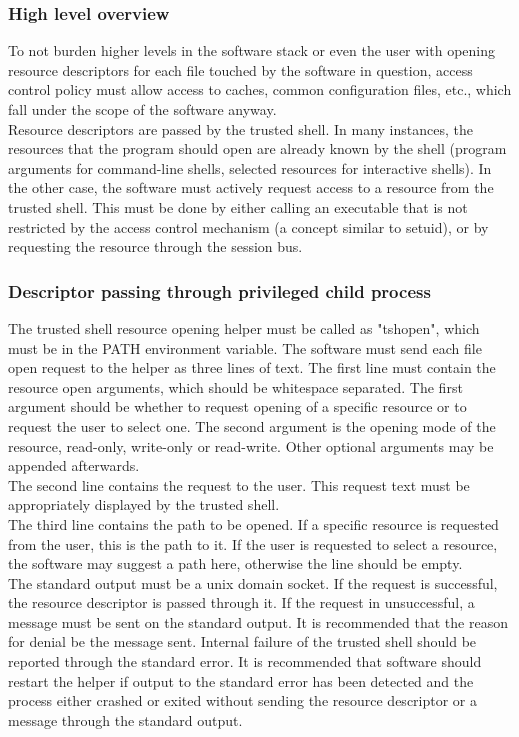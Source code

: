 \subsubsection{High level overview}
To not burden higher levels in the software stack or even the user with opening resource descriptors for each file touched by the software in question, access control policy must allow access to caches, common configuration files, etc., which fall under the scope of the software anyway.\\
Resource descriptors are passed by the trusted shell. In many instances, the resources that the program should open are already known by the shell (program arguments for command-line shells, selected resources for interactive shells). In the other case, the software must actively request access to a resource from the trusted shell. This must be done by either calling an executable that is not restricted by the access control mechanism (a concept similar to setuid), or by requesting the resource through the session bus.
\subsubsection{Descriptor passing through privileged child process}
The trusted shell resource opening helper must be called as "tshopen", which must be in the PATH environment variable. The software must send each file open request to the helper as three lines of text. The first line must contain the resource open arguments, which should be whitespace separated. The first argument should be whether to request opening of a specific resource or to request the user to select one. The second argument is the opening mode of the resource, read-only, write-only or read-write. Other optional arguments may be appended afterwards.\\
The second line contains the request to the user. This request text must be appropriately displayed by the trusted shell.\\
The third line contains the path to be opened. If a specific resource is requested from the user, this is the path to it. If the user is requested to select a resource, the software may suggest a path here, otherwise the line should be empty.\\
The standard output must be a unix domain socket. If the request is successful, the resource descriptor is passed through it. If the request in unsuccessful, a message must be sent on the standard output. It is recommended that the reason for denial be the message sent. Internal failure of the trusted shell should be reported through the standard error. It is recommended that software should restart the helper if output to the standard error has been detected and the process either crashed or exited without sending the resource descriptor or a message through the standard output.
